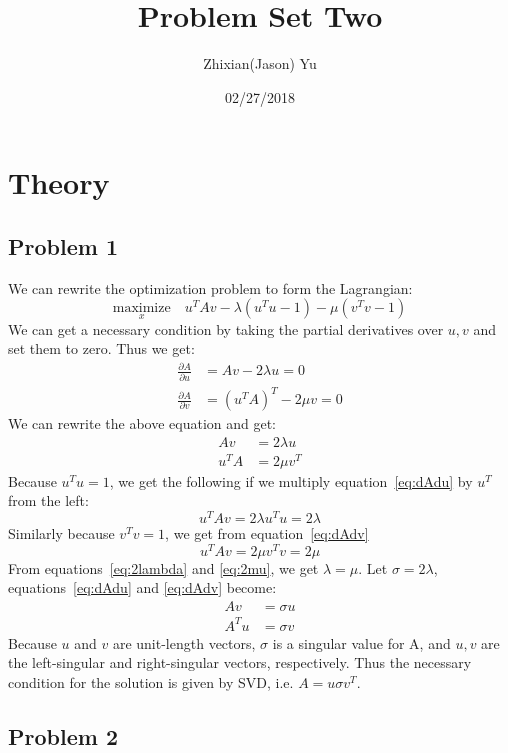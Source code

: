 \documentclass{article}
\title{Problem Set Two}
\date{02/27/2018}
\author{Zhixian(Jason) Yu}
\begin{document}
\maketitle
{}
\newpage

\section{Theory}
\subsection*{Problem 1}
We can rewrite the optimization problem to form the Lagrangian:
\begin{equation}
\underset{x}{\text{maximize}} \quad {u^TAv - \lambda(u^Tu - 1) - \mu(v^Tv - 1)}
\end{equation}
We can get a necessary condition by taking the partial derivatives over $u, v$ and set them to zero. Thus we get:
\begin{align}
\frac{\partial A}{\partial u} &= Av - 2\lambda u = 0 \\
\frac{\partial A}{\partial v} &= (u^TA)^T - 2\mu v = 0
\end{align}
We can rewrite the above equation and get:
\begin{align}
Av &= 2\lambda u  \label{eq:dAdu}\\
u^TA &= 2\mu v^T \label{eq:dAdv}
\end{align}
Because $u^Tu=1$, we get the following if we multiply equation~\ref{eq:dAdu} by $u^T$ from the left:
\begin{equation}
\label{eq:2lambda}
u^TAv = 2\lambda u^Tu = 2\lambda
\end{equation}
Similarly because $v^Tv=1$, we get from equation~\ref{eq:dAdv}
\begin{equation}
\label{eq:2mu}
u^TAv = 2\mu v^Tv = 2\mu
\end{equation}
From equations~\ref{eq:2lambda} and \ref{eq:2mu}, we get $\lambda=\mu$. Let $\sigma=2\lambda$, equations~\ref{eq:dAdu} and \ref{eq:dAdv} become:
\begin{align*}
Av &= \sigma u \\
A^T u &= \sigma v
\end{align*}
Because $u$ and $v$ are unit-length vectors, $\sigma$ is a singular value for A, and $u, v$ are the left-singular and right-singular vectors, respectively. Thus the necessary condition for the solution is given by SVD, i.e. $A=u\sigma v^T$.

\subsection*{Problem 2}
\end{document}
